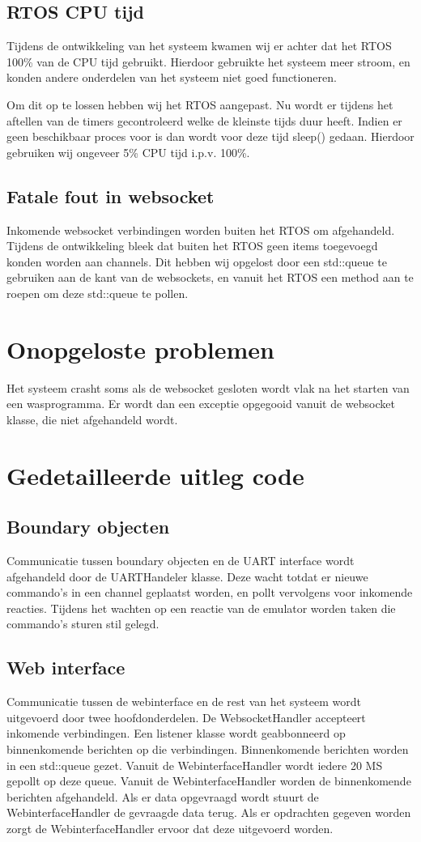 \subsection{RTOS CPU tijd}
Tijdens de ontwikkeling van het systeem kwamen wij er achter dat het RTOS 100\% van de CPU tijd gebruikt.
Hierdoor gebruikte het systeem meer stroom, en konden andere onderdelen van het systeem niet goed functioneren.

Om dit op te lossen hebben wij het RTOS aangepast.
Nu wordt er tijdens het aftellen van de timers gecontroleerd welke de kleinste tijds duur heeft. Indien er geen beschikbaar proces voor is dan wordt voor deze tijd sleep() gedaan.
Hierdoor gebruiken wij ongeveer 5\% CPU tijd i.p.v. 100\%.

\subsection{Fatale fout in websocket}
Inkomende websocket verbindingen worden buiten het RTOS om afgehandeld. 
Tijdens de ontwikkeling bleek dat buiten het RTOS geen items toegevoegd konden worden aan channels. Dit hebben wij opgelost door een std::queue te gebruiken aan de kant van de websockets, en vanuit het RTOS een method aan te roepen om deze std::queue te pollen.

\section{Onopgeloste problemen}
Het systeem crasht soms als de websocket gesloten wordt vlak na het starten van een wasprogramma. Er wordt dan een exceptie opgegooid vanuit de websocket klasse, die niet afgehandeld wordt.

\section{Gedetailleerde uitleg code}
\subsection{Boundary objecten}
Communicatie tussen boundary objecten en de UART interface wordt afgehandeld door de UARTHandeler klasse. Deze wacht totdat er nieuwe commando's in een channel geplaatst worden, en pollt vervolgens voor inkomende reacties. Tijdens het wachten op een reactie van de emulator worden taken die commando's sturen stil gelegd.

\subsection{Web interface}
Communicatie tussen de webinterface en de rest van het systeem wordt uitgevoerd door twee hoofdonderdelen. De WebsocketHandler accepteert inkomende verbindingen. Een listener klasse wordt geabbonneerd op binnenkomende berichten op die verbindingen. Binnenkomende berichten worden in een std::queue gezet. Vanuit de WebinterfaceHandler wordt iedere 20 MS gepollt op deze queue. Vanuit de WebinterfaceHandler worden de binnenkomende berichten afgehandeld. Als er data opgevraagd wordt stuurt de WebinterfaceHandler de gevraagde data terug. Als er opdrachten gegeven worden zorgt de WebinterfaceHandler ervoor dat deze uitgevoerd worden. 

